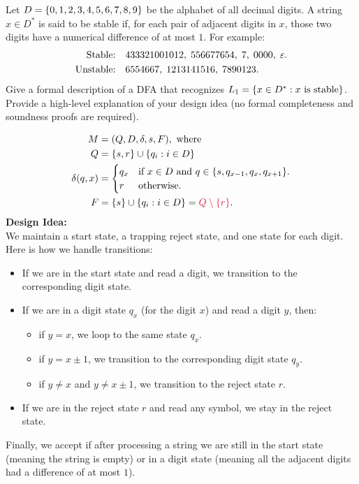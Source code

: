 \begin{problem}
  Let $D = \left\{0, 1, 2, 3, 4, 5, 6, 7, 8, 9 \right\}$
  be the alphabet of all decimal digits.
  A string $x \in D^*$ is said to be stable if,
  for each pair of adjacent digits in $x$,
  those two digits have a numerical difference of at most $1$.
  For example:
  \begin{align*}
    \text{Stable:} \quad & 433321001012,\; 556677654,\; 7,\;  0000,\; \varepsilon. \\
    \text{Unstable:} \quad & 6554667,\; 1213141516,\; 7890123.
  \end{align*}
  Give a formal description of a DFA that recognizes $L_1 = \left\{x \in D^* : x \text{ is stable}\right\}$.
  Provide a high-level explanation of your design idea
  (no formal completeness and soundness proofs are required).
\end{problem}
\begin{Answer}
  \begin{align*}
    M &= (Q, D, \delta, s, F), \text{ where } \\
    Q &= \set{s, r} \cup \set{q_i : i \in D} \\
    \delta(q, x) &= \begin{cases}
      q_x & \text{if $x \in D$ and $q \in \set{s, q_{x-1}, q_x, q_{x+1}}$.} \\
      r & \text{otherwise.} \\
    \end{cases} \\
    F &= \set{ s } \cup \set{ q_i : i \in D } = \crim{Q \setminus \set{ r }}.
  \end{align*}
  \textbf{Design Idea:}\\
  We maintain a start state, a trapping reject state,
  and one state for each digit.\\
  Here is how we handle transitions:
  \begin{itemize}
    \item If we are in the start state and read a digit,
      we transition to the corresponding digit state.
    \item If we are in a digit state $q_x$ (for the digit $x$)
      and read a digit $y$, then:
      \begin{itemize}
        \item if $y = x$, we loop to the same state $q_x$.
        \item if $y = x \pm 1$, we transition to the corresponding digit state $q_y$.
        \item if $y \ne x$ and $y \ne x \pm 1$, we transition to the reject state $r$.
      \end{itemize}
    \item If we are in the reject state $r$ and read any symbol,
      we stay in the reject state.
  \end{itemize}
  \step
  Finally, we accept if after processing a string we are still
  in the start state (meaning the string is empty) or in a digit state
  (meaning all the adjacent digits had a difference of at most $1$).
\end{Answer}
